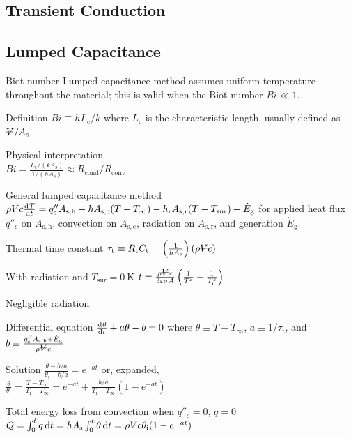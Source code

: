 \documentclass{article}
\begin{document}
\begin{multicols}{2}
\section{Transient Conduction}

\subsection{Lumped Capacitance}
\begin{description*}
\item[Biot number] Lumped capacitance method assumes uniform temperature throughout the material;
  this is valid when the Biot number \(\mathit{Bi} \ll 1\).
  \begin{description*}
  \item[Definition]
    \(\mathit{Bi} \equiv hL_\mathrm{c}/k\) where \(L_\mathrm{c}\) is the characteristic length,
    usually defined as \(\volsym / A_\mathrm{s}\).
  \item[Physical interpretation]~\\
    \(\mathit{Bi} = \frac{L_\mathrm{c}/(kA_\mathrm{s})}{1/(hA_\mathrm{s})}
    \approx R_\mathrm{cond}/R_\mathrm{conv}\)
  \end{description*}
\item[General lumped capacitance method]
  \(\rho \volsym c \od{T}{t} \\
  = q''_\mathrm{s}A_\mathrm{s,h} - hA_\mathrm{s,c}(T-T_\infty)
  - h_\mathrm{r}A_\mathrm{s,r}(T-T_\mathrm{sur}) + \dot{E}_\mathrm{g}\)
  for applied heat flux \(q''_\mathrm{s}\) on \(A_\mathrm{s,h}\), convection on \(A_\mathrm{s,c}\),
  radiation on \(A_\mathrm{s,r}\), and generation \(\dot{E}_\mathrm{g}\).
\item[Thermal time constant]
  \(\tau_\mathrm{t} \equiv R_\mathrm{t}C_\mathrm{t}
  = \left(\frac{1}{hA_\mathrm{s}}\right)(\rho\volsym{}c)\)
\item[With radiation and \(T_\mathrm{sur}=\SI{0}{\kelvin}\)]
  \(t = \frac{\rho\volsym{}c}{3\varepsilon\sigma A}\left(\frac{1}{T^3}-\frac{1}{T_\mathrm{i}^3}\right)\)
\item[Negligible radiation]~
  \begin{description*}
  \item[Differential equation]
    \(\od{\theta}{t} + a\theta - b = 0\) where
    \(\theta \equiv T-T_\infty\),
    \(a \equiv 1/\tau_\mathrm{t}\), and
    \(b \equiv \frac{q''_\mathrm{s}A_\mathrm{s,h}+\dot{E}_\mathrm{g}}{\rho\volsym{}c}\)
  \item[Solution]
    \(\frac{\theta-b/a}{\theta_\mathrm{i}-b/a} = e^{-at}\) or, expanded, \\
    \(\frac{\theta}{\theta_\mathrm{i}} = \frac{T-T_\infty}{T_\mathrm{i}-T_\infty}
    = e^{-at} + \frac{b/a}{T_\mathrm{i}-T_\infty}\left(1-e^{-at}\right)\)
  \item[Total energy loss from convection when $q''_\mathrm{s}=0$, $\dot{q}=0$]
    \(Q = \int_0^tq\dif{t}
    = hA_\mathrm{s}\int_0^t\theta\dif{t} \\
    = \rho\volsym{}c\theta_\mathrm{i}(1-e^{-at})\)
  \end{description*}
\end{description*}


\end{multicols}
\end{document}
